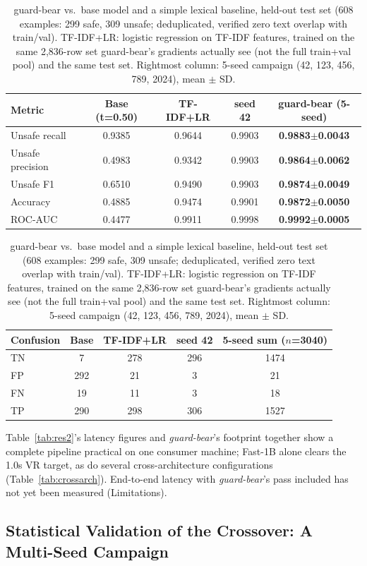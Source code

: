 \documentclass[pdflatex,sn-mathphys-num]{sn-jnl-official}%
\begin{document}
\begin{table}[!h]
  \centering
  \caption{guard-bear vs.\ base model and a simple lexical baseline, held-out test set (608 examples: 299 safe, 309 unsafe; deduplicated, verified zero text overlap with train/val). TF-IDF+LR: logistic regression on TF-IDF features, trained on the same 2{,}836-row set guard-bear's gradients actually see (not the full train+val pool) and the same test set. Rightmost column: 5-seed campaign (42, 123, 456, 789, 2024), mean $\pm$ SD.}
  \label{tab:guardheadline}
  \small
  \begin{tabular}{@{}lcccc@{}}
    \toprule
    Metric & Base (t=0.50) & TF-IDF+LR & seed 42 & guard-bear (5-seed) \\
    \midrule
    Unsafe recall    & 0.9385 & 0.9644 & 0.9903 & \textbf{0.9883$\pm$0.0043} \\
    Unsafe precision & 0.4983 & 0.9342 & 0.9903 & \textbf{0.9864$\pm$0.0062} \\
    Unsafe F1        & 0.6510 & 0.9490 & 0.9903 & \textbf{0.9874$\pm$0.0049} \\
    Accuracy         & 0.4885 & 0.9474 & 0.9901 & \textbf{0.9872$\pm$0.0050} \\
    ROC-AUC          & 0.4477 & 0.9911 & 0.9998 & \textbf{0.9992$\pm$0.0005} \\
    \bottomrule
  \end{tabular}
  \qquad
  \begin{tabular}{@{}lcccc@{}}
    \toprule
    Confusion & Base & TF-IDF+LR & seed 42 & 5-seed sum ($n$=3040) \\
    \midrule
    TN & 7   & 278 & 296 & 1474 \\
    FP & 292 & 21  & 3   & 21 \\
    FN & 19  & 11  & 3   & 18 \\
    TP & 290 & 298 & 306 & 1527 \\
    \bottomrule
  \end{tabular}
\end{table}

\label{sec:deployment}Table~\ref{tab:res2}'s latency figures and \textit{guard-bear}'s footprint together show a complete pipeline practical on one consumer machine; Fast-1B alone clears the 1.0s VR target, as do several cross-architecture configurations (Table~\ref{tab:crossarch}). End-to-end latency with \textit{guard-bear}'s pass included has not yet been measured (Limitations).

\subsection{Statistical Validation of the Crossover: A Multi-Seed Campaign}\label{sec:seedcampaign}
\end{document}
